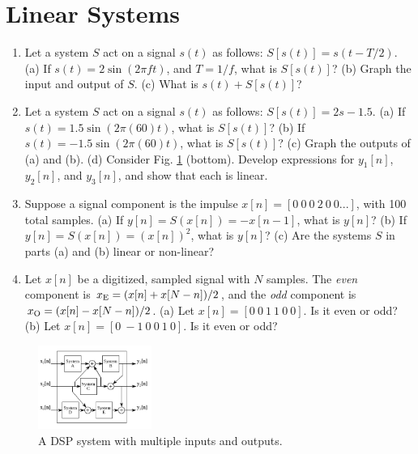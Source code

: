 \documentclass{article}
\begin{document}
\section{Linear Systems}

\begin{enumerate}
\item Let a system $S$ act on a signal $s(t)$ as follows: $S[s(t)] = s(t-T/2)$.  (a) If $s(t) = 2\sin(2\pi ft)$, and $T = 1/f$, what is $S[s(t)]$? (b) Graph the input and output of $S$. (c) What is $s(t) + S[s(t)]$? \\ \vspace{2cm}
\item Let a system $S$ act on a signal $s(t)$ as follows: $S[s(t)] = 2s - 1.5$. (a) If $s(t) = 1.5 \sin(2\pi(60)t)$, what is $S[s(t)]$? (b) If $s(t) = -1.5 \sin(2\pi(60)t)$, what is $S[s(t)]$? (c) Graph the outputs of (a) and (b). (d) Consider Fig. \ref{fig:1} (bottom).  Develop expressions for $y_1[n]$, $y_2[n]$, and $y_3[n]$, and show that each is linear. \\ \vspace{3cm}
\item Suppose a signal component is the impulse $x[n] = [0~0~0~2~0~0 ...]$, with 100 total samples.  (a) If $y[n] = S(x[n]) = -x[n-1]$, what is $y[n]$? (b) If $y[n] = S(x[n]) = (x[n])^2$, what is $y[n]$?  (c) Are the systems $S$ in parts (a) and (b) linear or non-linear? \\ \vspace{2cm}
\item Let $x[n]$ be a digitized, sampled signal with $N$ samples.  The \textit{even} component is $x_{\rm E} = (x[n] + x[N-n])/2$, and the \textit{odd} component is $x_{\rm O} = (x[n] - x[N-n])/2$. (a) Let $x[n] = [0~0~1~1~0~0]$.  Is it even or odd? (b) Let $x[n] = [0~-1~0~0~1~0]$.  Is it even or odd? 
\end{enumerate}

\begin{figure}
\centering
\includegraphics[width=0.33\textwidth]{commute_2.png}
\caption{\label{fig:1} A DSP system with multiple inputs and outputs.}
\end{figure}
\end{document}
